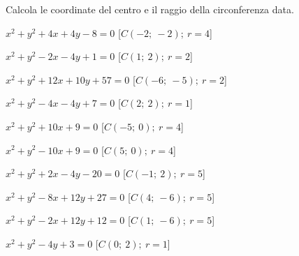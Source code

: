 \begin{esercizio}\label{ese:}
 Calcola le coordinate del centro e il raggio della circonferenza data.
 \begin{enumeratea}
  \item  \(x^2 + y^2 +4x +4y -8 = 0\)
   \hfill [\(C \left (-2;~-2 \right );~r = 4\)]
  \item  \(x^2 + y^2 -2x -4y +1 = 0\)
   \hfill [\(C \left (1;~2 \right );~r = 2\)]
  \item  \(x^2 + y^2 +12x +10y +57 = 0\)
   \hfill [\(C \left (-6;~-5 \right );~r = 2\)]
  \item  \(x^2 + y^2 -4x -4y +7 = 0\)
   \hfill [\(C \left (2;~2 \right );~r = 1\)]
  \item  \(x^2 + y^2 +10x +9 = 0\)
   \hfill [\(C \left (-5;~0 \right );~r = 4\)]
  \item  \(x^2 + y^2 -10x +9 = 0\)
   \hfill [\(C \left (5;~0 \right );~r = 4\)]
  \item  \(x^2 + y^2 +2x -4y -20 = 0\)
   \hfill [\(C \left (-1;~2 \right );~r = 5\)]
  \item  \(x^2 + y^2 -8x +12y +27 = 0\)
   \hfill [\(C \left (4;~-6 \right );~r = 5\)]
  \item  \(x^2 + y^2 -2x +12y +12 = 0\)
   \hfill [\(C \left (1;~-6 \right );~r = 5\)]
  \item  \(x^2 + y^2 -4y +3 = 0\)
   \hfill [\(C \left (0;~2 \right );~r = 1\)]
 \end{enumeratea}
\end{esercizio}


\subsubsection*{}

